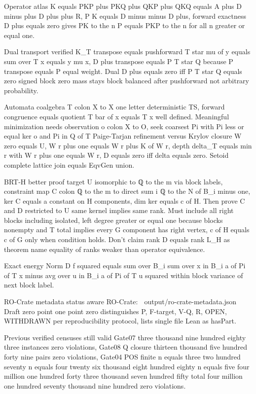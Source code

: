 Operator atlas
K equals PKP plus PKQ plus QKP plus QKQ equals A plus D minus plus D plus plus R, P K equals D minus minus D plus, forward exactness D plus equals zero gives PK to the n P equals PKP to the n for all n greater or equal one.

Dual transport verified
K_T transpose equals pushforward T star mu of y equals sum over T x equals y mu x, D plus transpose equals P T star Q because P transpose equals P equal weight. Dual D plus equals zero iff P T star Q equals zero signed block zero mass stays block balanced after pushforward not arbitrary probability.

Automata coalgebra
T colon X to X one letter deterministic TS, forward congruence equals quotient T bar of x equals T x well defined. Meaningful minimization needs observation o colon X to O, seek coarsest Pi with Pi less or equal ker o and Pi in Q of T Paige-Tarjan refinement versus Krylov closure W zero equals U, W r plus one equals W r plus K of W r, depth delta_T equals min r with W r plus one equals W r, D equals zero iff delta equals zero. Setoid complete lattice join equals EqvGen union.

BRT-H better proof target
U isomorphic to ℚ to the m via block labels, constraint map C colon ℚ to the m to direct sum i ℚ to the N of B_i minus one, ker C equals a constant on H components, dim ker equals c of H. Then prove C and D restricted to U same kernel implies same rank. Must include all right blocks including isolated, left degree greater or equal one because blocks nonempty and T total implies every G component has right vertex, c of H equals c of G only when condition holds. Don't claim rank D equals rank L_H as theorem name equality of ranks weaker than operator equivalence.

Exact energy
Norm D f squared equals sum over B_i sum over x in B_i a of Pi of T x minus avg over u in B_i a of Pi of T u squared within block variance of next block label.

RO-Crate metadata status aware
RO-Crate:
📎 output/ro-crate-metadata.json
Draft zero point one point zero distinguishes P, F-target, V-Q, R, OPEN, WITHDRAWN per reproducibility protocol, lists single file Lean as hasPart.

Previous verified censuses still valid Gate07 three thousand nine hundred eighty three instances zero violations, Gate08 Q closure thirteen thousand five hundred forty nine pairs zero violations, Gate04 POS finite n equals three two hundred seventy n equals four twenty six thousand eight hundred eighty n equals five four million one hundred forty three thousand seven hundred fifty total four million one hundred seventy thousand nine hundred zero violations.

